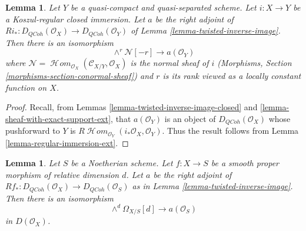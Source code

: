 \documentclass{stacks-project}
\theoremstyle{plain}
\newtheorem{lemma}[subsection]{Lemma}
\theoremstyle{definition}
\theoremstyle{remark}
\numberwithin{equation}{subsection}
\def\SheafHom{\mathop{\mathcal{H}\!\mathit{om}}\nolimits}
\def\QCoh{\mathit{QCoh}}
\begin{document}
\begin{lemma}
\label{lemma-regular-immersion}
Let $Y$ be a quasi-compact and quasi-separated scheme.
Let $i : X \to Y$ be a Koszul-regular closed immersion.
Let $a$ be the right adjoint of
$Ri_* : D_\QCoh(\mathcal{O}_X) \to D_\QCoh(\mathcal{O}_Y)$ of
Lemma \ref{lemma-twisted-inverse-image}. Then there is an isomorphism
$$
\wedge^r\mathcal{N}[-r] \longrightarrow a(\mathcal{O}_Y)
$$
where
$\mathcal{N} = \SheafHom_{\mathcal{O}_X}(\mathcal{C}_{X/Y}, \mathcal{O}_X)$
is the normal sheaf of $i$
(Morphisms, Section \ref{morphisms-section-conormal-sheaf})
and $r$ is its rank viewed as a locally constant
function on $X$.
\end{lemma}

\begin{proof}
Recall, from Lemmas \ref{lemma-twisted-inverse-image-closed}
and \ref{lemma-sheaf-with-exact-support-ext},
that $a(\mathcal{O}_Y)$ is an object of $D_\QCoh(\mathcal{O}_X)$ whose
pushforward to $Y$ is
$R\SheafHom_{\mathcal{O}_Y}(i_*\mathcal{O}_X, \mathcal{O}_Y)$.
Thus the result follows from Lemma \ref{lemma-regular-immersion-ext}.
\end{proof}

\begin{lemma}
\label{lemma-smooth-proper}
Let $S$ be a Noetherian scheme.
Let $f : X \to S$ be a smooth proper morphism of relative dimension $d$.
Let $a$ be the right adjoint of
$Rf_* : D_\QCoh(\mathcal{O}_X) \to D_\QCoh(\mathcal{O}_S)$ as in
Lemma \ref{lemma-twisted-inverse-image}. Then there is an isomorphism
$$
\wedge^d \Omega_{X/S}[d] \longrightarrow a(\mathcal{O}_S)
$$
in $D(\mathcal{O}_X)$.
\end{lemma}
\end{document}
